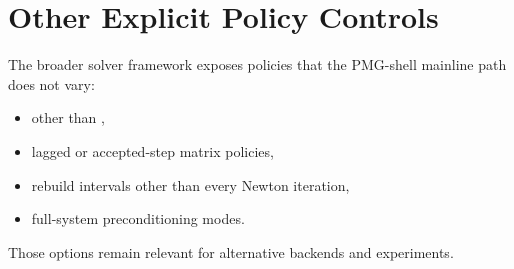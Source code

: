 \section{Other Explicit Policy Controls}

The broader solver framework exposes policies that the PMG-shell mainline path
does not vary:
\begin{itemize}
\item {} other than ,
\item lagged or accepted-step matrix policies,
\item rebuild intervals other than every Newton iteration,
\item full-system preconditioning modes.
\end{itemize}

Those options remain relevant for alternative backends and experiments.
